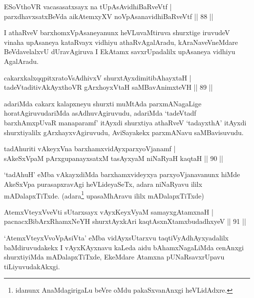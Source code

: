 \begin{shl}
ESoV\s thoVR vacasasatxsayx na tUpAsAvidhiBaRveVtf |\\
parxdhavxsatxBeVda aikAtemxyXV noVpAsanavidhiBaRveVtf \hfill || 88 ||
\end{shl}

\begin{artha}
I athaRveV barxhomxVpAsaneyanunx heVLuvaMtiruva shurxtige iruvudeV vinaha upAsaneya kataRvayx vidhiyu athaRvAgalAradu, kAraNaveVneMdare BeVdavelalxvU dUravAgiruva I EkAtamx savxrUpadalilx upAsaneya vidhiyu AgalAradu.
\end{artha}

\begin{shl}
cakarxkalxqqpitxratoV\s sAdhivxV shurxtAyxdimitibAhayxtaH |\\
tadeVtaditivAkAyxthoVR gArxhoyxV\s taH saMBavAnimxteVH \hfill || 89 ||
\end{shl}

\begin{artha}
adariMda cakarx kalapxneyu shurxti muMtAda parxmANagaLige horatAgiruvudariMda asAdhuvAgiruvudu, adariMda `tadeVtadf barxhAmxpUvaR manaparamf' itAyxdi shurxtiya athaRveV `tadayxthA' itAyxdi shurxtiyalilx gArxhayxvAgiruvudu, AviSayakekx parxmANavu saMBavisuvudu.
\end{artha}

\begin{shl}
tadAhuriti vAkeyxVna barxhamxvidAyxparxyoVjanamf |\\
sAkeSxVpaM pArxgupanayxsatxM tasAyxyaM niNaRyaH kaqtaH \hfill || 90 ||
\end{shl}

\begin{artha}
`tadAhuH' eMba vAkayxdiMda barxhamxvideyxya parxyoVjanavanunx hiMde
  AkeSxVpa purasapxravAgi heVLideyaSeTx, adara niNaRyavu ililx
  mADalapxTiTxde. (adara\footnote{idanunx AnaMdagirigaLu beVre oMdu
  pakaSxvanAnxgi heVLidAdxre.} upasaMhAravu ililx mADalapxTiTxde) 
\end{artha}


\begin{shl}
AtemxVteyxVveVti sUtarxsayx vAyxKeyxVyaM samayxgAtamxnaH |\\
pacnacxBibArxRhamxNeYH shurxtAyx\s kAri kaqtAsxnXtamxbudadhxyeV \hfill || 91 ||
\end{shl}

\begin{artha}
`AtemxVteyxVvoVpAsiVta' eMba vidAyxsUtarxvu taqtiVyAdhAyxyadalilx baMdiruvudakekx I   vAyxKAyxnavu kaLeda aidu bAhamxNagaLiMda cenAnxgi shurxtiyiMda   mADalapxTiTxde, EkeMdare Atamxna pUNaRsavxrUpavu tiLiyuvudakAkxgi.
\end{artha}

